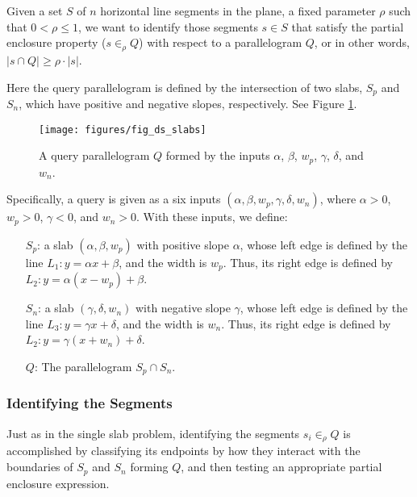 \begin{problem}
Given a set $S$ of $n$ horizontal line segments in the plane, a fixed parameter $\rho$ such that $0 < \rho \leq 1$, we want to identify those segments $s \in S$ that satisfy 
the partial enclosure property ($s \in_\rho Q$) with respect to a parallelogram $Q$, or in other words,  $|s \cap Q| \geq \rho \cdot |s|$.
\end{problem}


Here the query parallelogram is defined by the intersection of two slabs, $S_p$ and $S_n$, which have positive and negative slopes, respectively. See Figure \ref{fig:slabs:two:ds}.

\begin{figure}[t]
\begin{center}
  \texttt{[image: figures/fig\_ds\_slabs]}
  \caption{A query parallelogram $Q$ formed by the inputs $\alpha$, $\beta$, $w_p$,
  $\gamma$, $\delta$, and $w_n$.}
  \label{fig:slabs:two:ds}
\end{center}
\end{figure}

Specifically, a query is given as a six inputs $(\alpha, \beta, w_p, \gamma, \delta, 
w_n)$, where $\alpha > 0$, $w_p > 0$, $\gamma < 0$, and $w_n > 0$. With these inputs, we define:

\begin{itemize}
 \item[$S_p$:] a slab $(\alpha,\beta,w_p)$ with positive slope $\alpha$, whose left edge is defined 
 by the line $L_1 : y = \alpha x + \beta$, and the width is $w_p$. Thus, its right edge 
 is defined by $L_2 : y = \alpha (x - w_p) + \beta$.
 \item[$S_n$:] a slab $(\gamma,\delta,w_n)$ with negative slope $\gamma$, whose left edge is defined 
 by the line $L_3 : y = \gamma x + \delta$, and the width is $w_n$. Thus, its right edge 
 is defined by $L_2 : y = \gamma (x + w_n) + \delta$.
 \item[$Q$:] The parallelogram $S_p \cap S_n$.
\end{itemize}



\subsubsection{Identifying the Segments}
\label{:slabs:two:approach}

Just as in the single slab problem, identifying the segments $s_i \in_\rho Q$ 
is accomplished by classifying its endpoints by how they interact with 
the boundaries of $S_p$ and $S_n$ forming $Q$,  and then testing an appropriate partial enclosure expression. 

